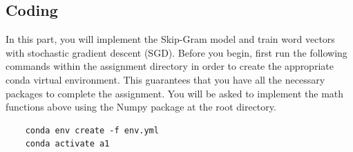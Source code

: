 \documentclass{assignment format}
\begin{document}
\subsection{Coding}
In this part, you will implement the Skip-Gram model and train word vectors with stochastic gradient descent (SGD). Before you begin, first run the following commands within the assignment directory in order to create the appropriate conda virtual environment. This guarantees that you have all the necessary packages to complete the assignment. You will be asked to implement the math functions above using the Numpy package at the root directory. 

\begin{verbatim}
    conda env create -f env.yml
    conda activate a1
\end{verbatim}
\end{document}
